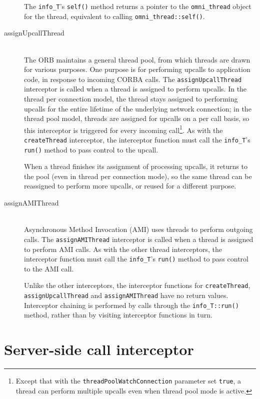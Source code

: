 \documentclass[11pt,twoside,a4paper]{book}
\newcommand{\type}[1]{\texttt{#1}}
\newcommand{\code}[1]{\texttt{#1}}
\newcommand{\op}[1]{\texttt{#1()}}
\begin{document}
\begin{description}
The \type{info\_T}'s \op{self} method returns a pointer to the
\type{omni\_thread} object for the thread, equivalent to calling
\op{omni\_thread::self}.


\item[assignUpcallThread]\mbox{}\\
%
The ORB maintains a general thread pool, from which threads are drawn
for various purposes. One purpose is for performing upcalls to
application code, in response to incoming CORBA calls. The
\code{assignUpcallThread} interceptor is called when a thread is
assigned to perform upcalls. In the thread per connection model, the
thread stays assigned to performing upcalls for the entire lifetime of
the underlying network connection; in the thread pool model, threads
are assigned for upcalls on a per call basis, so this interceptor is
triggered for every incoming call\footnote{Except that with the
  \code{threadPoolWatchConnection} parameter set \code{true}, a thread
  can perform multiple upcalls even when thread pool mode is
  active.}. As with the \code{createThread} interceptor, the
interceptor function must call the \type{info\_T}'s \op{run} method to
pass control to the upcall.

When a thread finishes its assignment of processing upcalls, it
returns to the pool (even in thread per connection mode), so the same
thread can be reassigned to perform more upcalls, or reused for a
different purpose.


\item[assignAMIThread]\mbox{}\\
%
Asynchronous Method Invocation (AMI) uses threads to perform outgoing
calls. The \code{assignAMIThread} interceptor is called when a thread
is assigned to perform AMI calls. As with the other thread
interceptors, the interceptor function must call the \type{info\_T}'s
\op{run} method to pass control to the AMI call.

Unlike the other interceptors, the interceptor functions for
\code{createThread}, \code{assignUpcallThread} and
\code{assignAMIThread} have no return values. Interceptor chaining is
performed by calls through the \op{info\_T::run} method, rather than
by visiting interceptor functions in turn.

\end{description}


\section{Server-side call interceptor}
\end{document}
